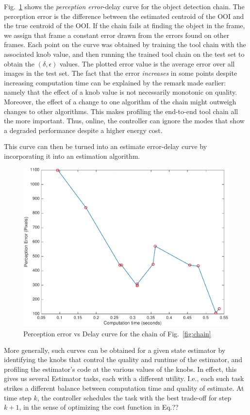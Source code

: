 Fig.~\ref{fig:chainErrorDelay} shows the \emph{perception error}-delay curve for the object detection chain.
The perception error is the difference between the estimated centroid of the OOI and the true centroid of the OOI.
If the chain fails at finding the object in the frame, we assign that frame a constant error drawn from the errors found on other frames.
Each point on the curve was obtained by training the tool chain with the associated knob value, and then running the trained tool chain on the test set to obtain the $(\delta,\epsilon)$ values.
The plotted error value is the average error over all images in the test set.
The fact that the error \emph{increases} in some points despite increasing computation time can be explained by the remark made earlier: namely that the effect of a knob value is not necessarily monotonic on quality.
Moreover, the effect of a change to one algorithm of the chain might outweigh changes to other algorithms.
This makes profiling the end-to-end tool chain all the more important.
Thus, online, the controller can ignore the modes that show a degraded performance despite a higher energy cost.

This curve can then be turned into an estimate error-delay curve by incorporating it into an estimation algorithm.
\begin{figure}[t]
	\centering
	\includegraphics[width=0.7\linewidth]{figures/chainErrorDelay}
	\caption{Perception error vs Delay curve for the chain of Fig.~\ref{fig:chain}}
	\label{fig:chainErrorDelay}
\end{figure}
More generally, such curves can be obtained for a given state estimator by identifying the knobs that control the quality and runtime of the estimator, and profiling the estimator's code at the various values of the knobs.
In effect, this gives us several Estimator tasks, each with a different utility. 
I.e., each such task strikes a different balance between computation time and quality of estimate.
At time step $k$, the controller schedules the task with the best trade-off for step $k+1$, in the sense of optimizing the cost function in Eq.??

